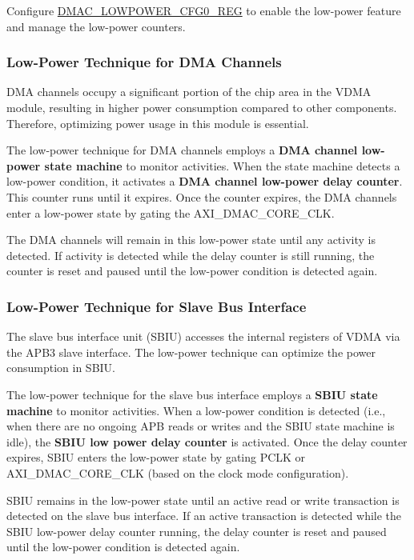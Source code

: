 \documentclass[main\_\_EN.tex]{subfiles}
\begin{document}
Configure \hyperref[regdesc:DMACLOWPOWERCFG0REG]{DMAC\_LOWPOWER\_CFG0\_REG} to enable the low-power feature and manage the low-power counters.

\subsubsection{Low-Power Technique for DMA Channels}

DMA channels occupy a significant portion of the chip area in the VDMA module, resulting in higher power consumption compared to other components. Therefore, optimizing power usage in this module is essential.

The low-power technique for DMA channels employs a \textbf{DMA channel low-power state machine} to monitor activities. When the state machine detects a low-power condition, it activates a \textbf{DMA channel low-power delay counter}. This counter runs until it expires. Once the counter expires, the DMA channels enter a low-power state by gating the AXI\_DMAC\_CORE\_CLK.

The DMA channels will remain in this low-power state until any activity is detected. If activity is detected while the delay counter is still running, the counter is reset and paused until the low-power condition is detected again.

\subsubsection{Low-Power Technique for Slave Bus Interface}

The slave bus interface unit (SBIU) accesses the internal registers of VDMA via the APB3 slave interface. The low-power technique can optimize the power consumption in SBIU.

The low-power technique for the slave bus interface employs a \textbf{SBIU state machine} to monitor activities. When a low-power condition is detected (i.e., when there are no ongoing APB reads or writes and the SBIU state machine is idle), the \textbf{SBIU low power delay counter} is activated. Once the delay counter expires, SBIU enters the low-power state by gating PCLK or AXI\_DMAC\_CORE\_CLK (based on the clock mode configuration).

SBIU remains in the low-power state until an active read or write transaction is detected on the slave bus interface. If an active transaction is detected while the SBIU low-power delay counter running, the delay counter is reset and paused until the low-power condition is detected again.
\end{document}
